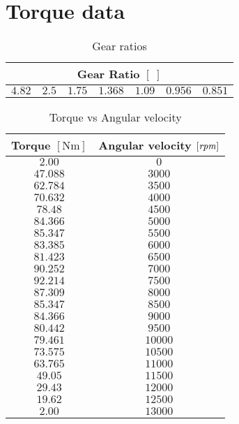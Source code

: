 \section{Torque data}
\label{app:TorqueData}
%
%
\begin{table}[h!]
    \centering
    \caption{Gear ratios}
    \label{tab:GearRatio}
    \begin{tabular}{@{}ccccccc@{}}
    \toprule
    \multicolumn{7}{c}{\textbf{Gear Ratio} $[\;]$} \\ \midrule
        $4.82$ & $2.5$ & $1.75$ & $1.368$ & $1.09$ & $0.956$ & $0.851$\\
    \bottomrule
    \end{tabular}
\end{table}
%
%
\begin{table}[h!]
    \centering
    \caption{Torque vs Angular velocity}
    \label{tab:TorqueVsRpm}
    \begin{tabular}{@{}cc@{}}
    \toprule
    \multicolumn{1}{c}{\textbf{Torque} $[\si{\newton\metre}]$} & \multicolumn{1}{c}{\textbf{Angular velocity} $[\it rpm]$} \\ \midrule
    $2.00  $  &  $0    $ \\
    $47.088$  &  $3000 $ \\
    $62.784$  &  $3500 $ \\
    $70.632$  &  $4000 $ \\
    $78.48 $  &  $4500 $ \\
    $84.366$  &  $5000 $ \\
    $85.347$  &  $5500 $ \\
    $83.385$  &  $6000 $ \\
    $81.423$  &  $6500 $ \\
    $90.252$  &  $7000 $ \\
    $92.214$  &  $7500 $ \\
    $87.309$  &  $8000 $ \\
    $85.347$  &  $8500 $ \\
    $84.366$  &  $9000 $ \\
    $80.442$  &  $9500 $ \\
    $79.461$  &  $10000$ \\
    $73.575$  &  $10500$ \\
    $63.765$  &  $11000$ \\
    $49.05 $  &  $11500$ \\
    $29.43 $  &  $12000$ \\
    $19.62 $  &  $12500$ \\
    $2.00  $  &  $13000$ \\ 
    \bottomrule
    \end{tabular}
\end{table}
%